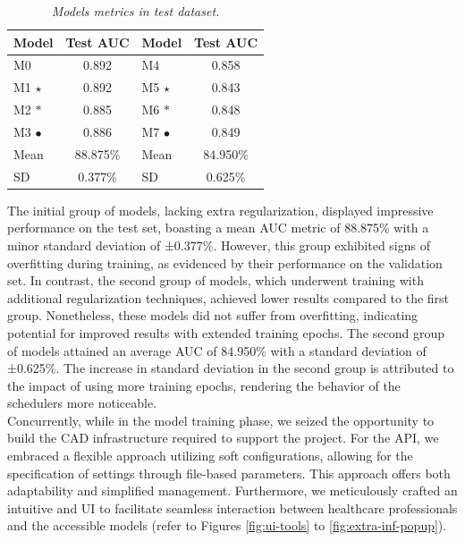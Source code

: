 \begin{table}[H]
\centering
\begin{tabular}{lc|lc}
    \toprule
  \textbf{Model} & \textbf{Test AUC} & \cellcolor{gray!50}\textbf{Model} & \cellcolor{gray!50}\textbf{Test AUC}  \\
\midrule
 M0 & 0.892 & \cellcolor{gray!50}M4 & \cellcolor{gray!50}0.858 \\
 M1 $\star$ & 0.892 & \cellcolor{gray!50}M5 $\star$ & \cellcolor{gray!50}0.843 \\
 M2 $\ast$ &  0.885 &  \cellcolor{gray!50}M6 $\ast$ & \cellcolor{gray!50}0.848 \\
 M3 $\bullet$ & 0.886 & \cellcolor{gray!50}M7 $\bullet$ & \cellcolor{gray!50}0.849 \\
 \midrule
Mean &  88.875\% & \cellcolor{gray!50}Mean & \cellcolor{gray!50}84.950\%  \\
SD &  0.377\%  &   \cellcolor{gray!50}SD &  \cellcolor{gray!50}0.625\%  \\

\bottomrule
\end{tabular}
\caption[Models metrics in test dataset]
  {\textit{Models metrics in test dataset.}}
{\label{table:test-set-resume-metrics}}
\end{table}

The initial group of models, lacking extra regularization, displayed impressive
performance on the test set, boasting a mean AUC metric of 88.875\% with a minor
standard deviation of ±0.377\%. However, this group exhibited signs of
overfitting during training, as evidenced by their performance on the
validation set. In contrast, the second group of models, which underwent
training with additional regularization techniques, achieved lower results
compared to the first group. Nonetheless, these models did not suffer from
overfitting, indicating potential for improved results with extended training
epochs. The second group of models attained an average AUC of 84.950\% with a
standard deviation of ±0.625\%. The increase in standard deviation in the second
group is attributed to the impact of using more training epochs, rendering the
behavior of the schedulers more noticeable. \\

Concurrently, while in the model training phase, we seized the opportunity to
build the CAD infrastructure required to support the project. For
the API, we embraced a flexible approach utilizing soft configurations,
allowing for the specification of settings through file-based parameters. This
approach offers both adaptability and simplified management. Furthermore, we
meticulously crafted an intuitive and UI to
facilitate seamless interaction between healthcare professionals and the
accessible models (refer to Figures \ref{fig:ui-tools} to \ref{fig:extra-inf-popup}). \\

